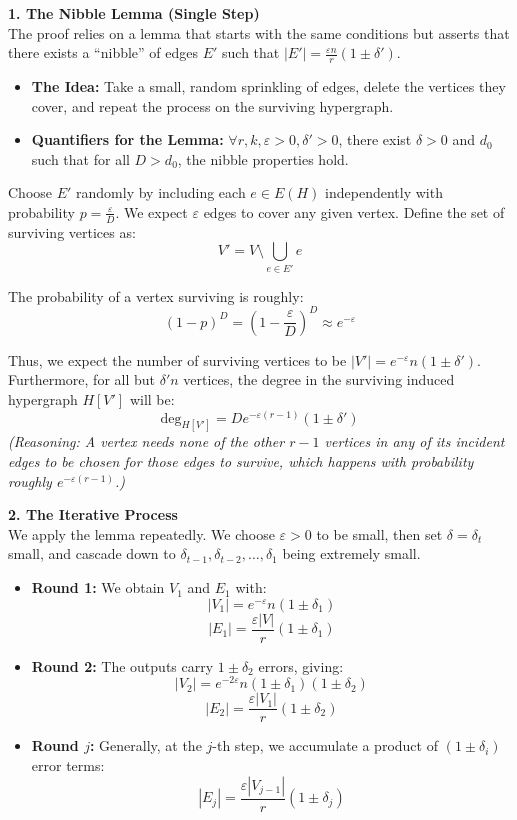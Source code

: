 \documentclass[a4paper]{article}
\begin{document}
\textbf{1. The Nibble Lemma (Single Step)} \\
The proof relies on a lemma that starts with the same conditions but asserts that there exists a ``nibble'' of edges $E'$ such that $|E'| = \frac{\varepsilon n}{r}(1 \pm \delta')$. 

\begin{itemize}
    \item \textbf{The Idea:} Take a small, random sprinkling of edges, delete the vertices they cover, and repeat the process on the surviving hypergraph. 
    \item \textbf{Quantifiers for the Lemma:} $\forall r, k, \varepsilon > 0, \delta' > 0$, there exist $\delta > 0$ and $d_0$ such that for all $D > d_0$, the nibble properties hold.
\end{itemize}

Choose $E'$ randomly by including each $e \in E(H)$ independently with probability $p = \frac{\varepsilon}{D}$. We expect $\varepsilon$ edges to cover any given vertex. Define the set of surviving vertices as:
$$V' = V \setminus \bigcup_{e \in E'} e$$

The probability of a vertex surviving is roughly:
$$(1 - p)^D = \left(1 - \frac{\varepsilon}{D}\right)^D \approx e^{-\varepsilon}$$

Thus, we expect the number of surviving vertices to be $|V'| = e^{-\varepsilon}n(1 \pm \delta')$. Furthermore, for all but $\delta'n$ vertices, the degree in the surviving induced hypergraph $H[V']$ will be:
$$\text{deg}_{H[V']} = De^{-\varepsilon(r-1)}(1 \pm \delta')$$
\textit{(Reasoning: A vertex needs none of the other $r-1$ vertices in any of its incident edges to be chosen for those edges to survive, which happens with probability roughly $e^{-\varepsilon(r-1)}$.)}

\textbf{2. The Iterative Process} \\
We apply the lemma repeatedly. We choose $\varepsilon > 0$ to be small, then set $\delta = \delta_t$ small, and cascade down to $\delta_{t-1}, \delta_{t-2}, \dots, \delta_1$ being extremely small.

\begin{itemize}
    \item \textbf{Round 1:} We obtain $V_1$ and $E_1$ with:
    $$|V_1| = e^{-\varepsilon}n(1 \pm \delta_1)$$
    $$|E_1| = \frac{\varepsilon|V|}{r}(1 \pm \delta_1)$$
    
    \item \textbf{Round 2:} The outputs carry $1 \pm \delta_2$ errors, giving:
    $$|V_2| = e^{-2\varepsilon}n(1 \pm \delta_1)(1 \pm \delta_2)$$
    $$|E_2| = \frac{\varepsilon|V_1|}{r}(1 \pm \delta_2)$$
    
    \item \textbf{Round $j$:} Generally, at the $j$-th step, we accumulate a product of $(1 \pm \delta_i)$ error terms:
    $$|E_j| = \frac{\varepsilon|V_{j-1}|}{r}(1 \pm \delta_j)$$
\end{itemize}
\end{document}
